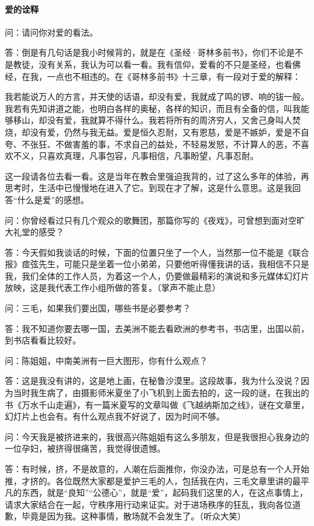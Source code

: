 \paragraph*{爱的诠释}
\par 问：请问你对爱的看法。
\par 答：倒是有几句话是我小时候背的，就是在《圣经·哥林多前书》，你们不论是不是教徒，没有关系，我认为可以看一看。我有信仰，爱看的不只是圣经，也看佛经，在我，一点也不相违的。在《哥林多前书》十三章，有一段对于爱的解释：
\par 我若能说万人的方言，并天使的话语，却没有爱，我就成了鸣的锣、响的钹一般。我若有先知讲道之能，也明白各样的奥秘，各样的知识，而且有全备的信，叫我能够移山，却没有爱，我就算不得什么。我若将所有的周济穷人，又舍己身叫人焚烧，却没有爱，仍然与我无益。爱是恒久忍耐，又有恩慈，爱是不嫉妒，爱是不自夸、不张狂、不做害羞的事，不求自己的益处，不轻易发怒，不计算人的恶，不喜欢不义，只喜欢真理，凡事包容，凡事相信，凡事盼望，凡事忍耐。
\par 这一段请各位去看一看。这是当年在教会里强迫我背的，过了这么多年的体验，再思考时，生活中已慢慢地在进入了它。到现在才了解，这是什么意思。这是我回答“什么是爱”的感想。
\par 问：你曾经看过只有几个观众的歌舞团，那篇你写的《夜戏》，可曾想到面对空旷大礼堂的感受？
\par 答：今天假如我谈话的时候，下面的位置只坐了一个人，当然那一位不能是《联合报》痖弦先生，可能只是坐着一位小弟弟，只要他听得懂我讲的话，我相信不只是我，我们全体的工作人员，为着这一个人，仍要做最精彩的演说和多元媒体幻灯片放映，这是我代表工作小组所做的答复。（掌声不能止息）
\par 问：三毛，如果我们要出国，哪些书是必要参考？
\par 答：我不知道你要去哪一国，去美洲不能去看欧洲的参考书，书店里，出国以前，到书店看看比较好。
\par 问：陈姐姐，中南美洲有一巨大图形，你有什么观点？
\par 答：这是我没有讲的，这是地上画，在秘鲁沙漠里。这段故事，我为什么没说？因为当时我生病了，由摄影师米夏坐了小飞机到上面去拍的，这一段的谜，在我出的书《万水千山走遍》，有一篇米夏写的文章叫做《飞越纳斯加之线》，谜在文章里，幻灯片上也会有。有什么观点我不好说了，因为时间不够。
\par 问：今天我是被挤进来的，我很高兴陈姐姐有这么多朋友，但是我很担心我身边的一位孕妇，被挤得很痛苦，我觉得很遗憾。
\par 答：有时候，挤，不是故意的，人潮在后面推你，你没办法，可是总有一个人开始推，才挤的。各位既然大家都是爱护三毛的人，包括我在内，三毛文章里讲的最平凡的东西，就是“良知”“公德心”，就是“爱”，起码我们这里的人，在这点事情上，请求大家结合在一起，守秩序用行动来证实。对于进场秩序的狂乱，我向各位道歉，毕竟是因为我。这种事情，散场就不会发生了。（听众大笑）
